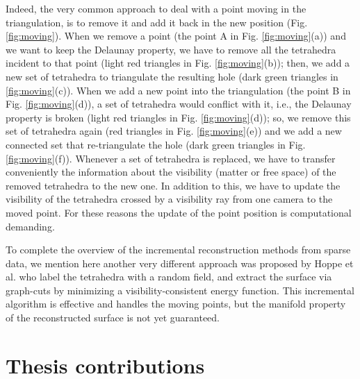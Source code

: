Indeed, the very common approach to deal with a point moving in the triangulation, is to remove it and add it back in the new position \cite{cgal} (Fig. \ref{fig:moving}). 
When we remove a point (the point A in Fig. \ref{fig:moving}(a)) and we want to keep the Delaunay property, we have to remove all the tetrahedra incident to that point (light red triangles in Fig. \ref{fig:moving}(b)); then, we add a new set of tetrahedra to triangulate the resulting hole (dark green triangles in \ref{fig:moving}(c)).
When we add a new point into the triangulation  (the point B in Fig. \ref{fig:moving}(d)), a set of tetrahedra would conflict with it, i.e., the Delaunay property is broken (light red triangles in Fig. \ref{fig:moving}(d)); so, we remove this set of tetrahedra again (red triangles in Fig. \ref{fig:moving}(e)) and we add a new connected set that re-triangulate the hole (dark green triangles in Fig. \ref{fig:moving}(f)).
Whenever a set of tetrahedra is replaced, we have to transfer conveniently the information about the visibility (matter or free space) of the removed tetrahedra to the new one. 
In addition to this, we have to update the visibility of the tetrahedra crossed by a visibility ray from one camera to the moved point.
For these reasons the update of the point position is computational demanding.

To complete the overview of the incremental reconstruction methods from sparse data, we mention here another very different approach was proposed by Hoppe et al. \cite{Hoppe13} who label the tetrahedra with a random field, and extract the surface via graph-cuts by minimizing a visibility-consistent energy function. This incremental algorithm is effective and handles the moving points, but the manifold property of the reconstructed surface is not yet guaranteed.



\section{Thesis contributions}

